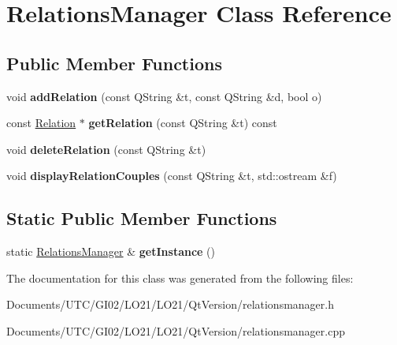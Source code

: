 \hypertarget{class_relations_manager}{}\section{Relations\+Manager Class Reference}
\label{class_relations_manager}
\subsection*{Public Member Functions}
\begin{DoxyCompactItemize}
\item 
\mbox{\label{class_relations_manager_a8fd9802237ce57d8c0b295291bbcc134}} 
void {\bfseries add\+Relation} (const Q\+String \&t, const Q\+String \&d, bool o)
\item 
\mbox{\label{class_relations_manager_afa0aefdcdf5eb54e667b5fbe84c2cd47}} 
const \hyperlink{class_relation}{Relation} $\ast$ {\bfseries get\+Relation} (const Q\+String \&t) const
\item 
\mbox{\label{class_relations_manager_aff0b03fb4d5885befbe4a6bbab7cbcac}} 
void {\bfseries delete\+Relation} (const Q\+String \&t)
\item 
\mbox{\label{class_relations_manager_a644ef25d2a85209b8a402e416da21311}} 
void {\bfseries display\+Relation\+Couples} (const Q\+String \&t, std\+::ostream \&f)
\end{DoxyCompactItemize}
\subsection*{Static Public Member Functions}
\begin{DoxyCompactItemize}
\item 
\mbox{\label{class_relations_manager_a21bcc3976b29e50f8689d3c6658d9ce4}} 
static \hyperlink{class_relations_manager}{Relations\+Manager} \& {\bfseries get\+Instance} ()
\end{DoxyCompactItemize}


The documentation for this class was generated from the following files\+:\begin{DoxyCompactItemize}
\item 
Documents/\+U\+T\+C/\+G\+I02/\+L\+O21/\+L\+O21/\+Qt\+Version/relationsmanager.\+h\item 
Documents/\+U\+T\+C/\+G\+I02/\+L\+O21/\+L\+O21/\+Qt\+Version/relationsmanager.\+cpp\end{DoxyCompactItemize}
